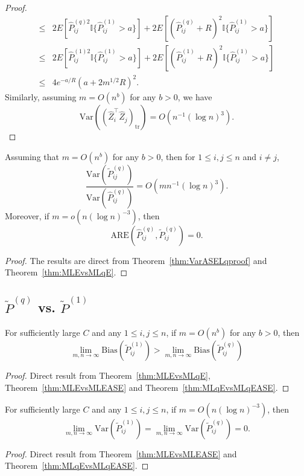 \begin{proof}
\begin{align*}
	\le & 2 E[\hat{P}^{(q)2}_{ij} \mathbb{I}\{\hat{P}^{(1)}_{ij} > a\}] + 2 E[(\hat{P}^{(q)}_{ij} + R)^2 \mathbb{I}\{\hat{P}^{(1)}_{ij} > a\}] \\
	\le & 2 E[\hat{P}^{(1)2}_{ij} \mathbb{I}\{\hat{P}^{(1)}_{ij} > a\}] + 2 E[(\hat{P}^{(1)}_{ij} + R)^2 \mathbb{I}\{\hat{P}^{(1)}_{ij} > a\}] \\
	\le & 4 e^{-a/R} (a + 2 m^{1/2} R)^2.
\end{align*}
Similarly, assuming $m = O(n^b)$ for any $b > 0$, we have
\[
	\mathrm{Var}((\hat{Z}_i^{\top} \hat{Z}_j)_{\mathrm{tr}})
	= O(n^{-1} (\log n)^3).
\]
\end{proof}

\begin{theorem}
\label{thm:ARELqproof}
Assuming that $m = O(n^b)$ for any $b > 0$,  then for $1 \le i, j \le n$ and $i \ne j$,
\[
	\frac{\mathrm{Var}(\widetilde{P}_{ij}^{(q)})}{\mathrm{Var}(\hat{P}_{ij}^{(q)})}
    = O(m n^{-1} (\log n)^3).
\]
Moreover, if $m = o(n (\log n)^{-3})$, then
\[
	\mathrm{ARE}(\hat{P}_{ij}^{(q)}, \widetilde{P}_{ij}^{(q)}) = 0.
\]
\end{theorem}
\begin{proof}
The results are direct from Theorem~\ref{thm:VarASELqproof} and Theorem~\ref{thm:MLEvsMLqE}.
\end{proof}


\subsection{$\widetilde{P}^{(q)}$ vs. $\widetilde{P}^{(1)}$}
\label{section:MLqEASEvsMLEASE}
\begin{theorem}
\label{thm:biasL1andLq}
For sufficiently large $C$ and any $1 \le i,j \le n$, if $m = O(n^b)$ for any $b > 0$, then
\[
	\lim_{m, n \to \infty} \mathrm{Bias}(\widetilde{P}_{ij}^{(1)})
    > \lim_{m, n \to \infty} \mathrm{Bias}(\widetilde{P}_{ij}^{(q)})
\]
\end{theorem}
\begin{proof}
Direct result from Theorem~\ref{thm:MLEvsMLqE}, Theorem~\ref{thm:MLEvsMLEASE} and Theorem~\ref{thm:MLqEvsMLqEASE}.
\end{proof}

\begin{theorem}
\label{thm:varianceL1andLq}
For sufficiently large $C$ and any $1 \le i,j \le n$, if $m = O(n (\log n)^{-3})$, then
\[
	\lim_{m, n \to \infty} \mathrm{Var}(\widetilde{P}_{ij}^{(1)})
    = \lim_{m, n \to \infty} \mathrm{Var}(\widetilde{P}_{ij}^{(q)}) = 0.
\]
\end{theorem}
\begin{proof}
Direct result from Theorem~\ref{thm:MLEvsMLEASE} and Theorem~\ref{thm:MLqEvsMLqEASE}.
\end{proof}



